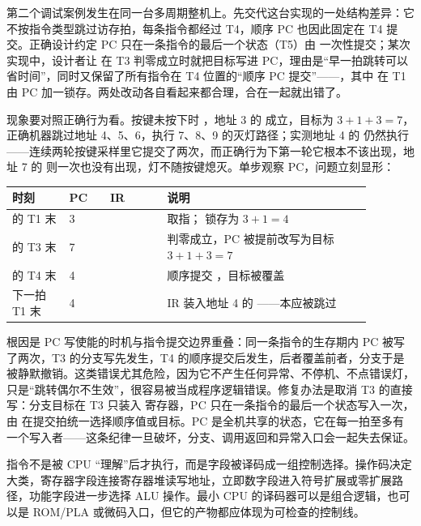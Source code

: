 第二个调试案例发生在同一台多周期整机上。先交代这台实现的一处结构差异：它不按指令类型跳过访存拍，每条指令都经过 T4，顺序 PC 也因此固定在 T4 提交。正确设计约定 PC 只在一条指令的最后一个状态（T5）由  一次性提交；某次实现中，设计者让  在 T3 判零成立时就把目标写进 PC，理由是“早一拍跳转可以省时间”，同时又保留了所有指令在 T4 位置的“顺序 PC 提交”——，其中  在 T1 由 PC 加一锁存。两处改动各自看起来都合理，合在一起就出错了。

现象要对照正确行为看。按键未按下时 ，地址 3 的  成立，目标为 $3+1+3=7$，正确机器跳过地址 4、5、6，执行 7、8、9 的灭灯路径；实测地址 4 的  仍然执行——连续两轮按键采样里它提交了两次，而正确行为下第一轮它根本不该出现，地址 7 的  则一次也没有出现，灯不随按键熄灭。单步观察 PC，问题立刻显形：

\begin{longtable}{L{0.14\linewidth}L{0.1\linewidth}L{0.14\linewidth}L{0.5\linewidth}}
\toprule
时刻 & PC & IR & 说明 \\
\midrule
{} 的 T1 末 & 3 &  & 取指； 锁存为 $3+1=4$ \\\tablerowrule
{} 的 T3 末 & 7 &  & 判零成立，PC 被提前改写为目标 $3+1+3=7$ \\\tablerowrule
{} 的 T4 末 & 4 &  & 顺序提交 ，目标被覆盖 \\\tablerowrule
下一拍 T1 末 & 4 &  & IR 装入地址 4 的 ——本应被跳过 \\
\bottomrule
\end{longtable}

根因是 PC 写使能的时机与指令提交边界重叠：同一条指令的生存期内 PC 被写了两次，T3 的分支写先发生，T4 的顺序提交后发生，后者覆盖前者，分支于是被静默撤销。这类错误尤其危险，因为它不产生任何异常、不停机、不点错误灯，只是“跳转偶尔不生效”，很容易被当成程序逻辑错误。修复办法是取消 T3 的直接写：分支目标在 T3 只装入  寄存器，PC 只在一条指令的最后一个状态写入一次，由  在提交拍统一选择顺序值或目标。PC 是全机共享的状态，它在每一拍至多有一个写入者——这条纪律一旦破坏，分支、调用返回和异常入口会一起失去保证。

指令不是被 CPU “理解”后才执行，而是字段被译码成一组控制选择。操作码决定大类，寄存器字段连接寄存器堆读写地址，立即数字段进入符号扩展或零扩展路径，功能字段进一步选择 ALU 操作。最小 CPU 的译码器可以是组合逻辑，也可以是 ROM/PLA 或微码入口，但它的产物都应体现为可检查的控制线。

